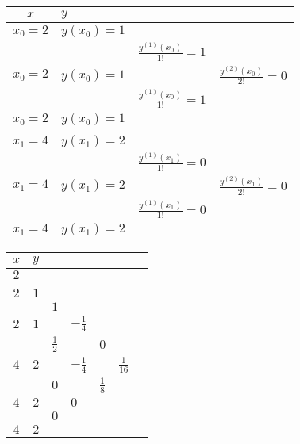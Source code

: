 \renewcommand{\arraystretch}{1.0}
\begin{minipage}{10cm}
	\begin{tabular}{|c|lll|}
		\hline
		$x$		&\multicolumn{3}{l|}{$y$}\\
		\hline
		$x_0=2$	&$y(x_0)=1$	&							&\\
				&			&$\frac{y^{(1)}(x_0)}{1!}=1$&\\
		$x_0=2$	&$y(x_0)=1$	&							&$\frac{y^{(2)}(x_0)}{2!}=0$\\
				&			&$\frac{y^{(1)}(x_0)}{1!}=1$&\\
		$x_0=2$	&$y(x_0)=1$	&							&\\
				&			&							&\\
		$x_1=4$	&$y(x_1)=2$	&							&\\
				&			&$\frac{y^{(1)}(x_1)}{1!}=0$&\\
		$x_1=4$	&$y(x_1)=2$	&							&$\frac{y^{(2)}(x_1)}{2!}=0$\\
				&			&$\frac{y^{(1)}(x_1)}{1!}=0$&\\
		$x_1=4$	&$y(x_1)=2$	&							&\\
		\hline
	\end{tabular}
\end{minipage}
\hfill
\begin{minipage}{10cm} 
	\begin{tabular}{|c|llllll|}
		\hline
		$x$	&\multicolumn{6}{l|}{$y$}\\
		\hline
		$2$	&\kreisS{$1$}{$a_0$}&			&			&			&				&\\
			&		&\kreisS{$1$}{$a_1$}		&			&			&				&\\
		$2$	&$1$	&			&\kreisS{$0$}{$a_2$}		&			&				&\\
			&		&$1$		&			&\kreisM{$-\frac 18$}{$a_3$}&				&\\
		$2$	&$1$	&			&$-\frac 14$&			&\kreisM{$\frac 1{16}$}{$a_4$}	&\\
			&		&$\frac 12$	&			&$0$		&				&\kreisS{$0$}{$a_5$}\\
		$4$	&$2$	&			&$-\frac 14$&			&$\frac 1{16}$	&\\
			&		&$0$		&			&$\frac 18$	&				&\\
		$4$	&$2$	&			&$0$		&			&				&\\
			&		&$0$		&			&			&				&\\
		$4$	&$2$	&			&			&			&				&\\
		\hline
	\end{tabular}
\end{minipage}\\
\renewcommand{\arraystretch}{1.5}

